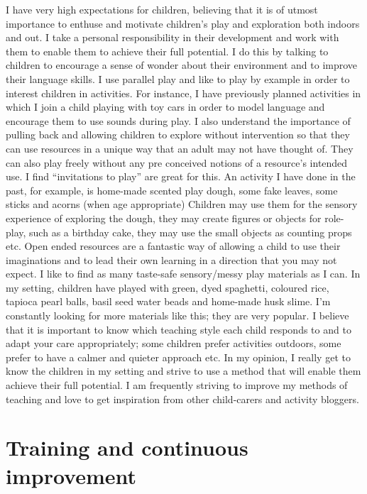 \documentclass[10pt,a4paper]{report}
\begin{document}
I have very high expectations for children, believing that it is of utmost importance to enthuse and motivate children's play and exploration both indoors and out. I take a personal responsibility in their development and work with them to enable them to achieve their full potential. I do this by talking to children to encourage a sense of wonder about their environment and to improve their language skills. I use parallel play and like to play by example in order to interest children in activities. For instance, I have previously planned activities in which I join a child playing with toy cars in order to model language and encourage them to use sounds during play. I also understand the importance of pulling back and allowing children to explore without intervention so that they can use resources in a unique way that an adult may not have thought of. They can also play freely without any pre conceived notions of a resource's intended use. I find “invitations to play” are great for this. An activity I have done in the past, for example, is home-made scented play dough, some fake leaves, some sticks and acorns (when age appropriate) Children may use them for the sensory experience of exploring the dough, they may create figures or objects for role-play, such as a birthday cake, they may use the small objects as counting props etc. Open ended resources are a fantastic way of allowing a child to use their imaginations and to lead their own learning in a direction that you may not expect. I like to find as many taste-safe sensory/messy play materials as I can. In my setting, children have played with green, dyed spaghetti, coloured rice, tapioca pearl balls, basil seed water beads and home-made husk slime. I'm constantly looking for more materials like this; they are very popular. I believe that it is important to know which teaching style each child responds to and to adapt your care appropriately; some children prefer activities outdoors, some prefer to have a calmer and quieter approach etc. In my opinion, I really get to know the children in my setting and strive to use a method that will enable them achieve their full potential. I am frequently striving to improve my methods of teaching and love to get inspiration from other child-carers and activity bloggers.

\section{Training and continuous improvement}
\end{document}
